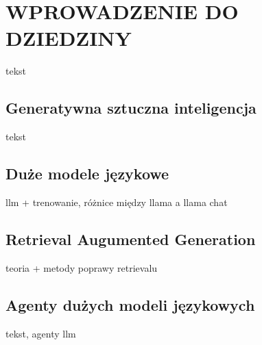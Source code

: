 \chapter{WPROWADZENIE DO DZIEDZINY}

tekst

\section{Generatywna sztuczna inteligencja}

tekst

\section{Duże modele językowe}

llm + trenowanie, różnice między llama a llama chat


\section{Retrieval Augumented Generation}

teoria + metody poprawy retrievalu

\section{Agenty dużych modeli językowych}

tekst, agenty llm